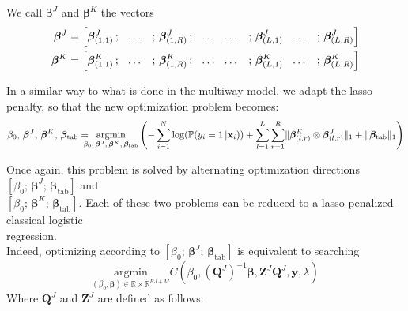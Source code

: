 \documentclass[10pt]{article}
\begin{document}
We call $\bm{\beta}^J$ and $\bm{\beta}^K$ the vectors
\begin{align}
    \bm{\beta}^J & = \left[ \bm{\beta}_{(1,1)}^J\, ; \hspace{7 pt} \hdots \hspace{7 pt} \, ; \, \bm{\beta}_{(1,R)}^J \,;    \hspace{7 pt} \hdots \hspace{7 pt}  \hdots \hspace{7 pt} \, ; \,  \bm{\beta}_{(L,1)}^J   \hspace{7 pt} \hdots \hspace{7 pt}  \, ;\,\bm{\beta}_{(L,R)}^J   \right] \\
    \bm{\beta}^K & = \left[ \bm{\beta}_{(1,1)}^K\, ; \hspace{7 pt} \hdots \hspace{7 pt} \, ; \, \bm{\beta}_{(1,R)}^K \,;    \hspace{7 pt} \hdots \hspace{7 pt}  \hdots \hspace{7 pt} \, ; \,  \bm{\beta}_{(L,1)}^K   \hspace{7 pt} \hdots \hspace{7 pt}  \, ;\,\bm{\beta}_{(L,R)}^K   \right]
\end{align}

\noindent In a similar way to what is done in the multiway model, we adapt the lasso penalty, so that the new optimization problem becomes:
\begin{equation}
    \beta_0 ,\, \bm{\beta}^J, \, \bm{\beta}^K, \, \bm{\beta}_{\text{tab}} = \hspace{- 8 pt} \underset{\beta_0 ,\, \bm{\beta}^J, \, \bm{\beta}^K, \, \bm{\beta}_{\text{tab}}}{\text{argmin}} \left(  - \sum\limits_{i = 1}^{N} \log(\mathbb{P}(y_i = 1 \, | \mathbf{x}_i)) + \sum\limits_{l = 1}^L \sum\limits_{r = 1}^R
    \lVert \bm{\beta}_{(l,r)}^K \otimes \bm{\beta}_{(l,r)}^J \rVert_1 + \lVert \bm{\beta}_{\text{tab}} \rVert_1 \right)
\end{equation}

\noindent Once again, this problem is solved by alternating optimization directions $\left[ \beta_0 ;\, \bm{\beta}^J ;\,  \bm{\beta}_{\text{tab}} \right]$ and\\
$\left[ \beta_0 ;\, \bm{\beta}^K ;\,  \bm{\beta}_{\text{tab}} \right]$. Each of these two problems can be reduced to a lasso-penalized classical logistic\\[3 pt]
regression.\\
Indeed, optimizing according to $\left[ \beta_0 ;\, \bm{\beta}^J ;\,  \bm{\beta}_{\text{tab}} \right]$ is equivalent to searching
\begin{equation}
    \underset{(\beta_0, \bm{\beta}) \in \mathbb{R} \times \mathbb{R}^{RJ + M}}{\text{argmin}}  C(\beta_0, (\mathbf{Q}^J)^{-1}\bm{\beta},\mathbf{Z}^J \mathbf{Q}^J, \mathbf{y}, \lambda)
\end{equation}
Where $\mathbf{Q}^J$ and $\mathbf{Z}^J$ are defined as follows:
\end{document}
